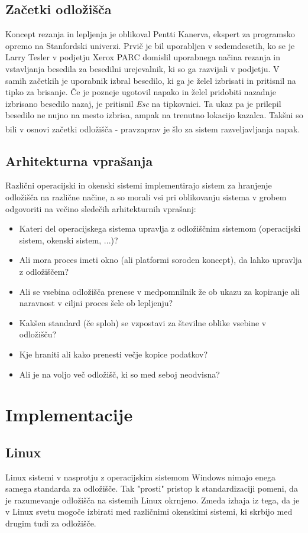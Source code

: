 \documentclass[12pt, A4]{article}
\begin{document}
	
	\subsection{Začetki odložišča}
	Koncept rezanja in lepljenja je oblikoval Pentti Kanerva, ekspert za programsko opremo na Stanfordski univerzi. Prvič je bil uporabljen v sedemdesetih, ko se je Larry Tesler v podjetju Xerox PARC domislil uporabnega načina rezanja in vstavljanja besedila za besedilni urejevalnik, ki so ga razvijali v podjetju. V samih začetkih je uporabnik izbral besedilo, ki ga je želel izbrisati in pritisnil na tipko za brisanje. Če je pozneje ugotovil napako in želel pridobiti nazadnje izbrisano besedilo nazaj, je pritisnil \textit{Esc} na tipkovnici. Ta ukaz pa je prilepil besedilo ne nujno na mesto izbrisa, ampak na trenutno lokacijo kazalca. Takšni so bili v osnovi začetki odložišča - pravzaprav je šlo za sistem razveljavljanja napak\textsuperscript{\cite{designingiteractions}}.
	
	
	\subsection{Arhitekturna vprašanja}
	Različni operacijski in okenski sistemi implementirajo sistem za hranjenje odložišča na različne načine, a so morali vsi pri oblikovanju sistema v grobem odgovoriti na večino sledečih arhitekturnih vprašanj:
	\begin{itemize}
		\item Kateri del operacijskega sistema upravlja z odložiščnim sistemom (operacijski sistem, okenski sistem, ...)?
		\item Ali mora proces imeti okno (ali platformi soroden koncept), da lahko upravlja z odložiščem?
		\item Ali se vsebina odložišča prenese v medpomnilnik že ob ukazu za kopiranje ali naravnost v ciljni proces šele ob lepljenju?
		\item Kakšen standard (če sploh) se vzpostavi za številne oblike vsebine v odložišču?
		\item Kje hraniti ali kako prenesti večje kopice podatkov?
		\item Ali je na voljo več odložišč, ki so med seboj neodvisna?
	\end{itemize}
	
	
	\pagebreak
	\section{Implementacije}
	\subsection{Linux}
	Linux sistemi v nasprotju z operacijskim sistemom Windows nimajo enega samega standarda za odložišče. Tak "prosti" pristop k standardizaciji pomeni, da je razumevanje odložišča na sistemih Linux okrnjeno.
	Zmeda izhaja iz tega, da je v Linux svetu mogoče izbirati med različnimi okenskimi sistemi, ki skrbijo med drugim tudi za odložišče. \\
	
\end{document}
